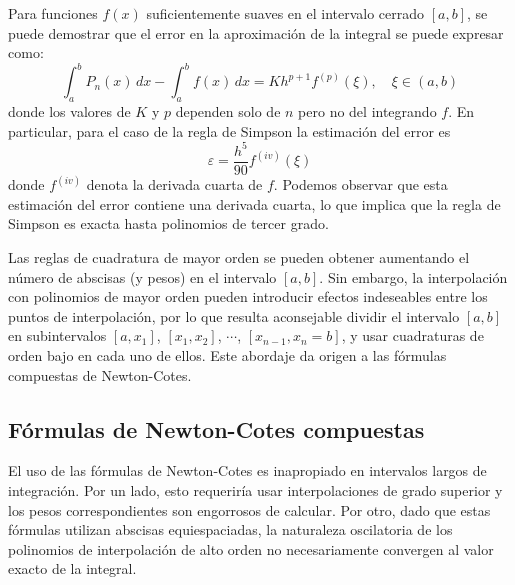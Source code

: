 Para funciones $f(x)$ suficientemente suaves en el intervalo cerrado $[a, b]$, se puede demostrar que el error en la aproximación de la integral se puede expresar como:
\begin{equation}
 \int_a^b P_n(x) \, dx - \int_a^b f(x) \, dx = K h^{p+1} f^{(p)}(\xi), \quad \xi \in (a, b)
\end{equation} 
donde los valores de $K$ y $p$ dependen solo de $n$ pero no del integrando $f$. En particular, para el caso de la regla de Simpson la estimación del error es
\begin{equation}\label{eq:intsimerr}
 \varepsilon = \frac{h^5}{90} f^{(iv)}(\xi)
\end{equation}
donde $f^{(iv)}$ denota la derivada cuarta de $f$. Podemos observar que esta estimación del error contiene una derivada cuarta, lo que implica que la regla de Simpson es exacta hasta polinomios de tercer grado.


Las reglas de cuadratura de mayor orden se pueden obtener aumentando el número de abscisas (y pesos) en el intervalo $[a, b]$. Sin embargo, la interpolación con polinomios de mayor orden pueden introducir efectos indeseables entre los puntos de interpolación, por lo que resulta aconsejable dividir el intervalo $[a, b]$ en subintervalos $[a, x_1]$, $[x_1, x_2]$, $\cdots$, $[x_{n-1}, x_n = b]$, y usar cuadraturas de orden bajo en cada uno de ellos. Este abordaje da origen a las fórmulas compuestas de Newton-Cotes.



\subsection{Fórmulas de Newton-Cotes compuestas}

El uso de las fórmulas de Newton-Cotes es inapropiado en intervalos largos de integración. Por un lado, esto requeriría usar interpolaciones de grado superior y los pesos correspondientes son engorrosos de calcular. Por otro, dado que estas fórmulas utilizan abscisas equiespaciadas, la naturaleza oscilatoria de los polinomios de interpolación de alto orden no necesariamente convergen al valor exacto de la integral.


